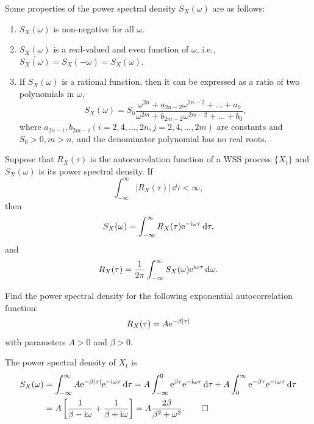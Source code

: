 \begin{proposition}
  Some properties of the power spectral density \(S_X(\omega)\) are as follows:
  \begin{enumerate}
    \item \(S_X(\omega)\) is non-negative for all \(\omega\).
    \item \(S_X(\omega)\) is a real-valued and even function of \(\omega\), i.e., \(\overline{S_X(\omega)} = S_X(-\omega) = S_X(\omega)\).
    \item If \(S_X(\omega)\) is a rational function, then it can be expressed as a ratio of two polynomials in \(\omega\),
    \[
      S_X(\omega) = S_0 \frac{\omega^{2n} + a_{2n-2}\omega^{2n-2} + \dots + a_0}{\omega^{2m} + b_{2m-2}\omega^{2m-2} + \dots + b_0},
    \]
    where \(a_{2n - i}, b_{2m - i} (i = 2, 4, \dots, 2n, j = 2, 4, \dots, 2m)\) are constants and \(S_0 > 0, m > n\), and the denominator polynomial has no real roots.
  \end{enumerate}
\end{proposition}

\begin{theorem}\label{thm:Wiener-Khinchin}
  Suppose that \(R_X(\tau)\) is the autocorrelation function of a WSS process \(\{X_t\}\) and \(S_X(\omega)\) is its power spectral density. If
  \[
    \int_{-\infty}^\infty |R_X(\tau)| \, \dd\tau < \infty,
  \]
  then
  \[
    S_X(\omega) = \int_{-\infty}^\infty R_X(\tau) \mathrm{e}^{-\mathrm{i} \omega \tau} \, \mathrm{d}\tau,
  \]
  and
  \[
    R_X(\tau) = \frac{1}{2\mathrm{\pi}} \int_{-\infty}^\infty S_X(\omega) \mathrm{e}^{\mathrm{i} \omega \tau} \, \mathrm{d}\omega.
  \]
\end{theorem}

\begin{example}
  Find the power spectral density for the following exponential autocorrelation function:
  \[
    R_X(\tau) = A \mathrm{e}^{-\beta |\tau|}
  \]
  with parameters \(A > 0\) and \(\beta > 0\).
\end{example}
\begin{solution}
  The power spectral density of \(X_t\) is
  \begin{align*}
    S_X(\omega) &= \int_{-\infty}^\infty A \mathrm{e}^{-\beta |\tau|} \mathrm{e}^{-\mathrm{i} \omega \tau} \, \mathrm{d}\tau = A \int_{-\infty}^0 \mathrm{e}^{\beta \tau} \mathrm{e}^{-\mathrm{i} \omega \tau} \, \mathrm{d}\tau + A \int_0^\infty \mathrm{e}^{-\beta \tau} \mathrm{e}^{-\mathrm{i} \omega \tau} \, \mathrm{d}\tau \\
    &= A\left[\frac{1}{\beta - \mathrm{i} \omega} + \frac{1}{\beta + \mathrm{i} \omega}\right] = A\frac{2\beta}{\beta^2 + \omega^2}. \qedhere
  \end{align*}
\end{solution}

